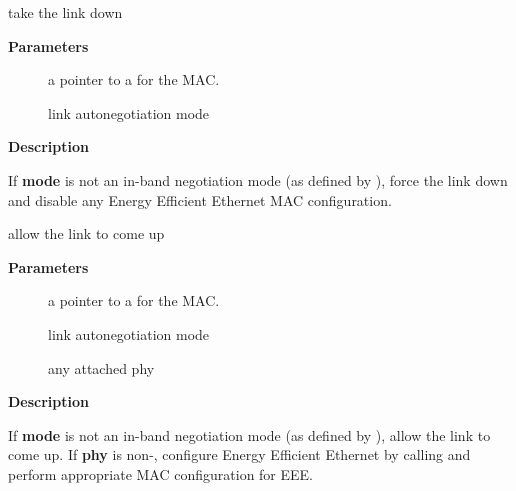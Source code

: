 \documentclass[a4paper,8pt,english]{sphinxmanual}
\begin{document}
\begin{fulllineitems}
\label{networking/kapi:c.mac_link_down}
take the link down

\end{fulllineitems}


\textbf{Parameters}
\begin{description}
\item[{}] \leavevmode
a pointer to a {\hyperref[networking/kapi:c.net_device]{\emph{}}} for the MAC.

\item[{}] \leavevmode
link autonegotiation mode

\end{description}

\textbf{Description}

If \textbf{mode} is not an in-band negotiation mode (as defined by
), force the link down and disable any
Energy Efficient Ethernet MAC configuration.

\begin{fulllineitems}
\label{networking/kapi:c.mac_link_up}
allow the link to come up

\end{fulllineitems}


\textbf{Parameters}
\begin{description}
\item[{}] \leavevmode
a pointer to a {\hyperref[networking/kapi:c.net_device]{\emph{}}} for the MAC.

\item[{}] \leavevmode
link autonegotiation mode

\item[{}] \leavevmode
any attached phy

\end{description}

\textbf{Description}

If \textbf{mode} is not an in-band negotiation mode (as defined by
), allow the link to come up. If \textbf{phy}
is non-, configure Energy Efficient Ethernet by calling
{\hyperref[networking/kapi:c.phy_init_eee]{\emph{}}} and perform appropriate MAC configuration for EEE.
\end{document}
